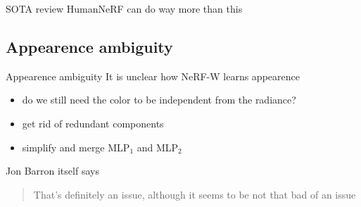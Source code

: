 \documentclass[aspectratio=1610]{beamer}
\begin{document}
\begin{frame}{SOTA review}
    HumanNeRF can do way more than this
\end{frame}

\subsection{Appearence ambiguity}
\begin{frame}{Appearence ambiguity}
    It is unclear how NeRF-W learns appearence
    \bigskip
    \begin{itemize}
        \item do we still need the color to be independent from the radiance?
        \item get rid of redundant components
        \item simplify and merge MLP\(_1\) and MLP\(_2\)
    \end{itemize}
    \bigskip
    \begin{exampleblock}{Jon Barron itself says}
        \begin{quote}
            That's definitely an issue, although it seems to be not that bad of an issue
          \end{quote}
    \end{exampleblock}
\end{frame}

\end{document}
